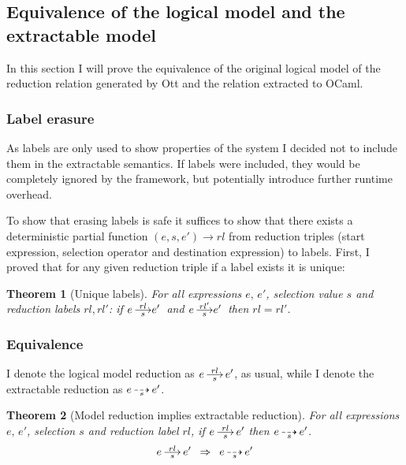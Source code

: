 \documentclass[12pt,twoside,notitlepage]{report}
\newcommand{\red}[2]{\stackon[.05ex]{\stackunder[-0.05ex]{$\longrightarrow$}{$\scriptstyle #1$}}{$\scriptstyle #2$}}
\newcommand{\xred}[1]{\stackunder[-0.05ex]{$\dashrightarrow$}{$\scriptstyle #1$}}
\theoremstyle{plain}%
\newtheorem{thm}{Theorem}[section]
\theoremstyle{definition}
\theoremstyle{remark}
\begin{document}
\subsection{Equivalence of the logical model and the extractable model}
In this section I will prove the equivalence of the original logical model of the reduction relation generated by Ott and the relation extracted to OCaml.
\subsubsection{Label erasure}
As labels are only used to show properties of the system I decided not to include them in the extractable semantics. If labels were included, they would be completely ignored by the framework, but potentially introduce further runtime overhead.

To show that erasing labels is safe it suffices to show that there exists a deterministic partial function $ (e,s,e') \rightarrow rl $ from reduction triples (start expression, selection operator and destination expression) to labels. First, I proved that for any given reduction triple if a label exists it is unique:
\begin{thm}[Unique labels]
\label{thm:unique_label}
For all expressions $ e,\, e'$, selection value $ s $ and reduction labels $ rl, rl' $:
 if $ e\, \red{s}{rl}e'\, $ and $ e\, \red{s}{rl'}e'\, $ then $ rl = rl' $. 
\end{thm}
\subsubsection{Equivalence}
I denote the logical model reduction as $ e\, \red{s}{rl}\, e' $, as usual, while I denote the extractable reduction as $ e\, \xred{s}\, e' $.

\begin{thm}[Model reduction implies extractable reduction]
\label{thm:jo_to_xjo}
For all expressions $ e,\,e' $, selection $ s $ and reduction label $ rl $, if $ e\, \red{s}{rl}\, e' $ then $  e\, \xred{s}\, e' $.
\[  e\, \red{s}{rl}\, e' \,\,\,\Rightarrow \,\,\, e\, \xred{s}\, e' \]
\end{thm}
\end{document}
